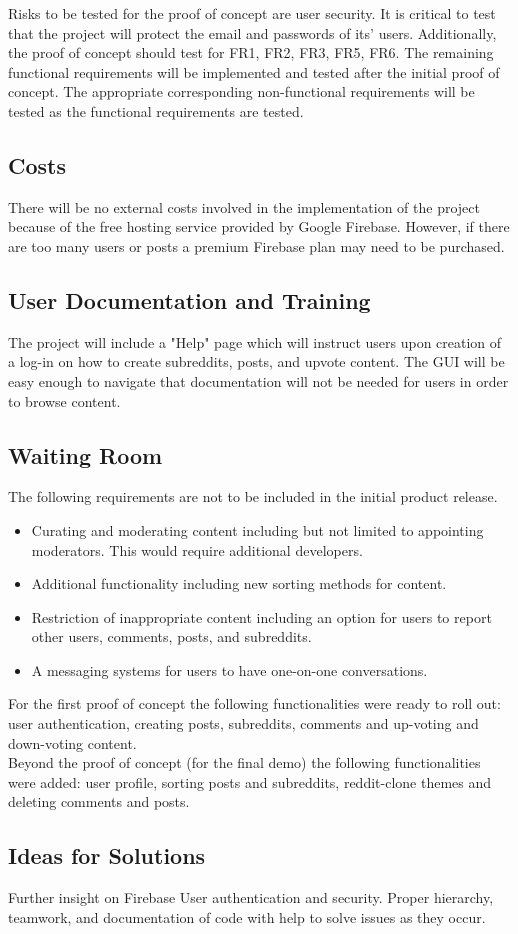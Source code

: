 \documentclass[12pt,fleqn]{article}
\begin{document}
Risks to be tested for the proof of concept are user security.  It is critical to test that the project will protect the email and passwords of its' users.  Additionally, the proof of concept should test for FR1, FR2, FR3, FR5, FR6.  The remaining functional requirements will be implemented and tested after the initial proof of concept.  The appropriate corresponding non-functional requirements will be tested as the functional requirements are tested. 

\subsection {Costs}
There will be no external costs involved in the implementation of the project because of the free hosting service provided by Google Firebase. However, if there are too many users or posts a premium Firebase plan may need to be purchased. 

\subsection {User Documentation and Training}
The project will include a "Help" page which will instruct users upon creation of a log-in on how to create subreddits, posts, and upvote content.  The GUI will be easy enough to navigate that documentation will not be needed for users in order to browse content.
\subsection {Waiting Room}
The following requirements are not to be included in the initial product release.
\begin{itemize}
\item Curating and moderating content including but not limited to appointing moderators.  This would require additional developers.
\item Additional functionality including new sorting methods for content.
\item Restriction of inappropriate content including an option for users to report other users, comments, posts, and subreddits.
\item A messaging systems for users to have one-on-one conversations.
\end{itemize}

For the first proof of concept the following functionalities were ready to roll out:  user authentication, creating posts, subreddits, comments and up-voting and down-voting content. \\

Beyond the proof of concept (for the final demo) the following functionalities were added: user profile, sorting posts and subreddits, reddit-clone themes and deleting comments and posts. 

\subsection {Ideas for Solutions}
Further insight on Firebase User authentication and security. 
Proper hierarchy, teamwork, and documentation of code with help to solve issues as they occur.
\end{document}
